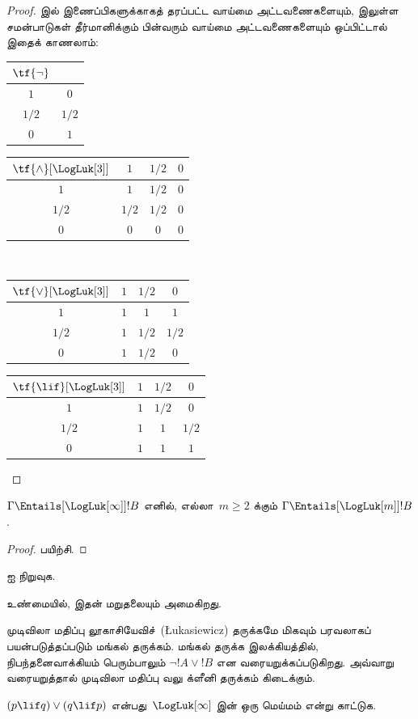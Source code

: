 \documentclass[../../../include/open-logic-section]{subfiles}
\begin{document}
\begin{proof}
   இல் இணைப்பிகளுக்காகத் தரப்பட்ட வாய்மை
  அட்டவணைகளையும்,  இலுள்ள சமன்பாடுகள் தீர்மானிக்கும்
  பின்வரும் வாய்மை அட்டவணைகளையும் ஒப்பிட்டால் இதைக் காணலாம்:
  \begin{center}
    \begin{tabular}{c|c} 
      $\tf{\lnot}$ & \\ 
      \hline  
      $1$ & $0$ \\ 
      $1/2$ & $1/2$ \\
      $0$ & $1$ 
    \end{tabular}
    \quad
    \begin{tabular}{c|ccc} 
      $\tf{\land}[\LogLuk[3]]$ & $1$ & $1/2$ & $0$ \\ 
      \hline 
      $1$ & $1$ & $1/2$ & $0$ \\ 
      $1/2$ & $1/2$ & $1/2$ & $0$\\ 
      $0$ & $0$ & $0$ & $0$ 
    \end{tabular}
    \\[2ex]
    \begin{tabular}{c|ccc} 
      $\tf{\lor}[\LogLuk[3]]$ & $1$ & $1/2$ & $0$ \\ 
      \hline 
      $1$ & $1$ & $1$ & $1$ \\ 
      $1/2$ & $1$ & $1/2$ & $1/2$ \\
      $0$ & $1$ & $1/2$ & $0$ 
    \end{tabular}
    \quad
    \begin{tabular}{c|ccc} 
      $\tf{\lif}[\LogLuk[3]]$ & $1$ & $1/2$ & $0$ \\ 
      \hline 
      $1$ & $1$ & $1/2$ & $0$ \\ 
      $1/2$ & $1$ & $1$ & $1/2$  \\ 
      $0$ & $1$ & $1$ & $1$ 
    \end{tabular}
  \end{center} 
\end{proof}

\begin{prop}
  $\Gamma \Entails[\LogLuk[\infty]] !B$ எனில், எல்லா~$m \ge 2$ க்கும்
  $\Gamma \Entails[\LogLuk[m]] !B$.
\end{prop}

\begin{proof}
  பயிற்சி.
\end{proof}

\begin{prob}
   ஐ நிறுவுக.
\end{prob}

உண்மையில், இதன் மறுதலையும் அமைகிறது.

முடிவிலா மதிப்பு லூகாசியேவிச்~(\L ukasiewicz) தருக்கமே மிகவும் பரவலாகப்
பயன்படுத்தப்படும் மங்கல் தருக்கம். மங்கல் தருக்க இலக்கியத்தில்,
நிபந்தனைவாக்கியம் பெரும்பாலும் $\lnot !A \lor !B$ என வரையறுக்கப்படுகிறது.
அவ்வாறு வரையறுத்தால் முடிவிலா மதிப்பு வலு க்ளீனி தருக்கம் கிடைக்கும்.

\begin{prob}
  $(p \lif q) \lor (q \lif p)$ என்பது~$\LogLuk[\infty]$ இன் ஒரு
  மெய்மம் என்று காட்டுக.
\end{prob}
\end{document}

